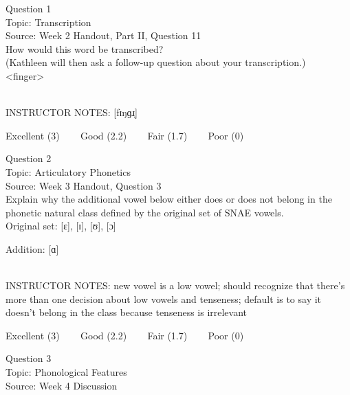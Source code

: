 \documentclass[12pt]{article}
\begin{document}
\begin{center}
\textbf{{\color{blue}{\HUGE START OF EXAM\\}}}

\textbf{{\color{blue}{\HUGE Student ID: 23286\\}}}

\textbf{{\color{blue}{\HUGE \\}}}

\end{center}
\newpage

{\large Question 1}\\

Topic: Transcription\\
Source: Week 2 Handout, Part II, Question 11\\

How would this word be transcribed?\\ (Kathleen will then ask a follow-up question about your transcription.)\\

<finger>


~\\
INSTRUCTOR NOTES: [fɪŋɡɹ̩]


\vfill
Excellent (3) ~~~ Good (2.2) ~~~ Fair (1.7) ~~~ Poor (0)
\newpage

{\large Question 2}\\

Topic: Articulatory Phonetics\\
Source: Week 3 Handout, Question 3\\

Explain why the additional vowel below either does or does not belong in the phonetic natural class defined by the original set of SNAE vowels.\\

Original set: {[ɛ]}, {[ɪ]}, {[ʊ]}, {[ɔ]}

Addition: {[ɑ]}


~\\
INSTRUCTOR NOTES: new vowel is a low vowel; should recognize that there's more than one decision about low vowels and tenseness; default is to say it doesn't belong in the class because tenseness is irrelevant


\vfill
Excellent (3) ~~~ Good (2.2) ~~~ Fair (1.7) ~~~ Poor (0)
\newpage

{\large Question 3}\\

Topic: Phonological Features\\
Source: Week 4 Discussion\\
\end{document}
